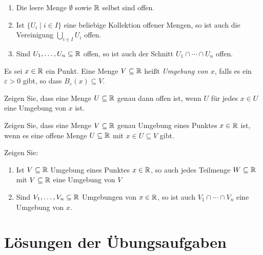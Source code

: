 \documentclass[a4paper,10pt]{article}
\begin{document}
\begin{lem}
 \begin{enumerate}
  \item
   Die leere Menge $\emptyset$ sowie $\mathbb{R}$ selbst sind offen.
  \item
   Ist $\{U_i \mid i \in I\}$ eine beliebige Kollektion offener Mengen, so ist auch die Vereinigung $\bigcup_{i \in I} U_i$ offen.
  \item
   Sind $U_1, \dotsc, U_n \subseteq \mathbb{R}$ offen, so ist auch der Schnitt $U_1 \cap \dotsb \cap U_n$ offen.
 \end{enumerate}
\end{lem}


\begin{defi}
 Es sei $x \in \mathbb{R}$ ein Punkt. Eine Menge $V \subseteq \mathbb{R}$ heißt \emph{Umgebung von $x$}, falls es ein $\varepsilon > 0$ gibt, so dass $B_\varepsilon(x) \subseteq V$.
\end{defi}


\begin{question}
 Zeigen Sie, dass eine Menge $U \subseteq \mathbb{R}$ genau dann offen ist, wenn $U$ für jedes $x \in U$ eine Umgebung von $x$ ist.
\end{question}


\begin{question}
 Zeigen Sie, dass eine Menge $V \subseteq \mathbb{R}$ genau Umgebung eines Punktes $x \in \mathbb{R}$ ist, wenn es eine offene Menge $U \subseteq \mathbb{R}$ mit $x \in U \subseteq V$ gibt.
\end{question}


\begin{question}
 Zeigen Sie: 
 \begin{enumerate}
  \item
   Ist $V \subseteq \mathbb{R}$ Umgebung eines Punktes $x \in \mathbb{R}$, so auch jedes Teilmenge $W \subseteq \mathbb{R}$ mit $V \subseteq \mathbb{R}$ eine Umgebung von $V$
  \item
   Sind $V_1, \dotsc, V_n \subseteq \mathbb{R}$ Umgebungen von $x \in \mathbb{R}$, so ist auch $V_1 \cap \dotsb \cap V_n$ eine Umgebung von $x$.
 \end{enumerate}
\end{question}





\section{Lösungen der Übungsaufgaben}

\printsolutions
\end{document}
